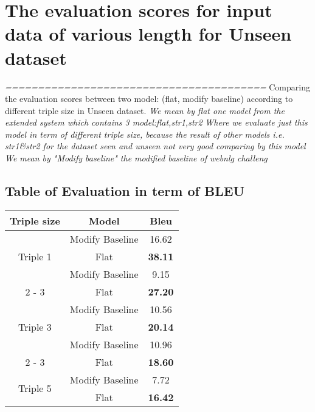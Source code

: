 \documentclass{article}%
\begin{document}
%
\normalsize%
\section{The evaluation scores for input data of various length for Unseen dataset}%
\textit{========================================\newline%
}%
Comparing the evaluation scores between two model: (flat, modify baseline) according to different triple size in Unseen dataset.\newline%
%
\textit{We mean by flat one model from the extended system which contains 3 model:flat,str1,str2\newline%
}%
\textit{Where we evaluate just this model in term of different triple size, because the result of other models i.e. str1\&str2 for the dataset seen and unseen not very good comparing by this model\newline%
}%
\textit{We mean by "Modify baseline" the modified baseline of webnlg challeng \newline%
}%
\subsection{Table of Evaluation in term of BLEU \newline%
}%
\begin{tabular}{|c|c|c|}%
\hline%
\textbf{Triple size}&\textbf{Model}&\textbf{Bleu}\\%
\hline%
\multirow{3}{*}{Triple 1}&Modify Baseline&16.62\\%
\cline{2%
-%
3}%
&Flat&\textbf{38.11}\\%
\hline%
\hline%
\multirow{3}{*}{Triple 2}&Modify Baseline&9.15\\%
\cline{2%
-%
3}%
&Flat&\textbf{27.20}\\%
\hline%
\hline%
\multirow{3}{*}{Triple 3}&Modify Baseline&10.56\\%
\cline{2%
-%
3}%
&Flat&\textbf{20.14}\\%
\hline%
\hline%
\multirow{3}{*}{Triple 4}&Modify Baseline&10.96\\%
\cline{2%
-%
3}%
&Flat&\textbf{18.60}\\%
\hline%
\hline%
\multirow{3}{*}{Triple 5}&Modify Baseline&7.72\\%
\cline{2%
-%
3}%
&Flat&\textbf{16.42}\\%
\hline%
\hline%
\end{tabular}

%
\end{document}
